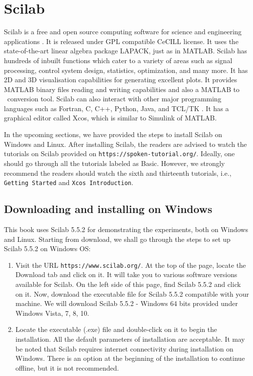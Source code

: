 \section{Scilab}
\label{sec:sci-start}
Scilab is a free and open source computing software for science and
engineering applications \cite{scilab-ref}. It is released under GPL
compatible CeCILL license.  It uses the state-of-the-art linear
algebra package LAPACK, just as in MATLAB.  Scilab has hundreds of
inbuilt functions which cater to a variety of areas such as signal
processing, control system design, statistics, optimization, and many
more. It has 2D and 3D visualisation capabilities for generating
excellent plots. It provides MATLAB binary files reading and writing
capabilities and also a MATLAB to \scilab\ conversion tool. Scilab can
also interact with other major programming languages such as Fortran,
C, C++, Python, Java, and TCL/TK \cite{scilab-interop}.  It has a
graphical editor called Xcos, which is similar to Simulink of MATLAB. 

In the upcoming sections, we have provided the steps to install Scilab on 
Windows and Linux. After installing Scilab, the readers are advised to 
watch the tutorials on Scilab provided on {\tt https://spoken-tutorial.org/}. 
Ideally, one should go through all the tutorials labeled as Basic. 
However, we strongly recommend the readers should watch the sixth and 
thirteenth tutorials, i.e., {\tt Getting Started} and {\tt Xcos Introduction}. 


\subsection{Downloading and installing on Windows}\label{scilab-installation-windows}
This book uses Scilab 5.5.2 for demonstrating the experiments, 
both on Windows and Linux. Starting from download, we shall go through 
the steps to set up Scilab 5.5.2 on Windows OS:

\begin{enumerate}
      \item Visit the URL {\tt https://www.scilab.org/}. 
      At the top of the page, locate the Download tab and click on it. 
      It will take you to various software versions available for Scilab. 
      On the left side of this page, find Scilab 5.5.2 and click on it. 
      Now, download the executable file for Scilab 5.5.2 compatible with your machine. 
      We will download Scilab 5.5.2 - Windows 64 bits provided under 
      Windows Vista, 7, 8, 10. 
      \item Locate the executable (.exe) file and double-click on it to 
      begin the installation. All the default parameters of installation 
      are acceptable. It may be noted that Scilab requires internet 
      connectivity during installation on Windows. There is an option 
      at the beginning of the installation to continue offline, 
      but it is not recommended. 
\end{enumerate}

